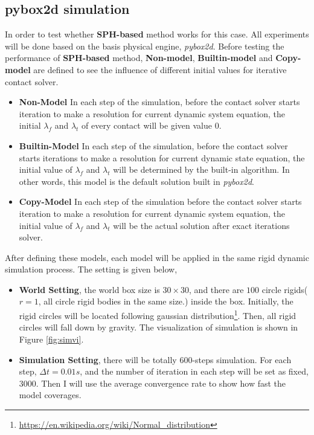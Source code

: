 \subsection{pybox2d simulation}
    \label{sph:exp}
    In order to test whether \textbf{SPH-based} method works for this case. All experiments will be done based on the basis physical engine, \textit{pybox2d}. Before testing the performance of \textbf{SPH-based} method, \textbf{Non-model}, \textbf{Builtin-model} and \textbf{Copy-model} are defined to see the influence of different initial values for iterative contact solver.
    \begin{itemize}
        \item \textbf{Non-Model} In each step of the simulation, before the contact solver starts iteration to make a resolution for current dynamic system equation, the initial $\lambda_{f}$ and $\lambda_{t}$ of every contact will be given value $0$.
        \item \textbf{Builtin-Model} In each step of the simulation, before the contact solver starts iterations to make a resolution for current dynamic state equation, the initial value of $\lambda_f$ and $\lambda_{t}$ will be determined by the built-in algorithm. In other words, this model is the default solution built in \textit{pybox2d}.
        \item \textbf{Copy-Model} In each step of the simulation before the contact solver starts iteration to make a resolution for current dynamic system equation, the initial value of $\lambda_f$ and $\lambda_t$ will be the actual solution after exact iterations solver.
    \end{itemize}
    After defining these models, each model will be applied in the same rigid dynamic simulation process. The setting is given below,
    \begin{itemize}
        \item \textbf{World Setting}, the world box size is $30\times30$,   and there are $100$ circle rigids($r=1$, all circle rigid bodies in the same size.) inside the box. Initially, the rigid circles will be located following gaussian distribution\footnote{\url{https://en.wikipedia.org/wiki/Normal_distribution}}. Then, all rigid circles will fall down by gravity. The visualization of simulation is shown in Figure \ref{fig:simvi}.
        \item \textbf{Simulation Setting}, there will be totally $600$-steps simulation. For each step, $\Delta t = 0.01s$, and the number of iteration in each step will be set as fixed, $3000$. Then I will use the average convergence rate to show how fast the model coverages.
    \end{itemize}
